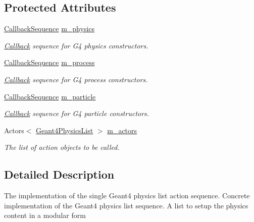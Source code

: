 \subsection*{Protected Attributes}
\begin{DoxyCompactItemize}
\item 
\hyperlink{struct_d_d4hep_1_1_callback_sequence}{CallbackSequence} \hyperlink{class_d_d4hep_1_1_simulation_1_1_geant4_physics_list_action_sequence_a13902a9fa275fd80e465f51e1e32439f}{m\_\-physics}
\begin{DoxyCompactList}\small\item\em \hyperlink{class_d_d4hep_1_1_callback}{Callback} sequence for G4 physics constructors. \item\end{DoxyCompactList}\item 
\hyperlink{struct_d_d4hep_1_1_callback_sequence}{CallbackSequence} \hyperlink{class_d_d4hep_1_1_simulation_1_1_geant4_physics_list_action_sequence_ae2f6d60bc1654668ee661e9010b5fa82}{m\_\-process}
\begin{DoxyCompactList}\small\item\em \hyperlink{class_d_d4hep_1_1_callback}{Callback} sequence for G4 process constructors. \item\end{DoxyCompactList}\item 
\hyperlink{struct_d_d4hep_1_1_callback_sequence}{CallbackSequence} \hyperlink{class_d_d4hep_1_1_simulation_1_1_geant4_physics_list_action_sequence_ab83212b1da37b0e855097936968be22f}{m\_\-particle}
\begin{DoxyCompactList}\small\item\em \hyperlink{class_d_d4hep_1_1_callback}{Callback} sequence for G4 particle constructors. \item\end{DoxyCompactList}\item 
Actors$<$ \hyperlink{class_d_d4hep_1_1_simulation_1_1_geant4_physics_list}{Geant4PhysicsList} $>$ \hyperlink{class_d_d4hep_1_1_simulation_1_1_geant4_physics_list_action_sequence_a7b456f14e717d23f85827b8e0c8bab72}{m\_\-actors}
\begin{DoxyCompactList}\small\item\em The list of action objects to be called. \item\end{DoxyCompactList}\end{DoxyCompactItemize}


\subsection{Detailed Description}
The implementation of the single Geant4 physics list action sequence. Concrete implementation of the Geant4 physics list sequence. A list to setup the physics content in a modular form


